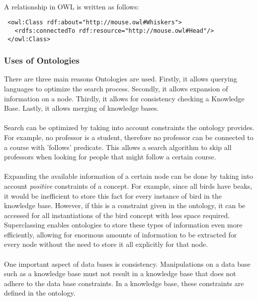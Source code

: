 \documentclass{article}
\begin{document}
 \paragraph{}
 A relationship in OWL is written as follows:
 
 \lstset{language=XML}
 \begin{lstlisting}
 <owl:Class rdf:about="http://mouse.owl#Whiskers">
   <rdfs:connectedTo rdf:resource="http://mouse.owl#Head"/>
 </owl:Class>
 \end{lstlisting}
 
 \subsubsection{Uses of Ontologies}
 There are three main reasons Ontologies are used. Firstly, it allows querying languages to optimize the search process. Secondly, it allows expansion of information on a node. Thirdly, it allows for consistency checking a Knowledge Base. Lastly, it allows merging of knowledge bases.
 \paragraph{}
 Search can be optimized by taking into account constraints the ontology provides. For example, no professor is a student, therefore no professor can be connected to a course with 'follows' predicate. This allows a search algorithm to skip all professors when looking for people that might follow a certain course.
 \paragraph{}
 Expanding the available information of a certain node can be done by taking into account \textit{positive} constraints of a concept. For example, since all birds have beaks, it would be inefficient to store this fact for every instance of bird in the knowledge base. However, if this is a constraint given in the ontology, it can be accessed for all instantiations of the bird concept with less space required. Superclassing enables ontologies to store these types of information even more efficiently, allowing for enormous amounts of information to be extracted for every node without the need to store it all explicitly for that node.
 \paragraph{}
 One important aspect of data bases is consistency. Manipulations on a data base such as a knowledge base must not result in a knowledge base that does not adhere to the data base constraints. In a knowledge base, these constraints are defined in the ontology.
\end{document}
